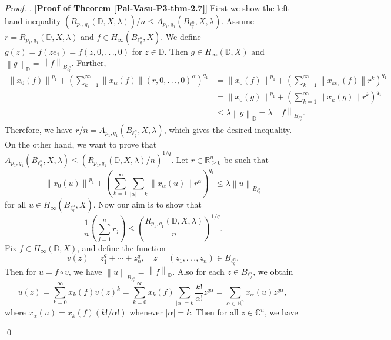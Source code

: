 \documentclass[a4paper,12pt]{amsart}
\theoremstyle{definition}
\newenvironment{pf}[1][]{%
 \vskip 3mm
 \noindent
 \ifthenelse{\equal{#1}{}}%
  {{\slshape Proof. }}%
  {{\slshape #1.} }%
 }%
{\qed\bigskip}
\newcommand{\norm}[1]{\left\lVert#1\right\rVert}
\begin{document}
\begin{pf} [{\bf Proof of Theorem \ref{Pal-Vasu-P3-thm-2.7}}]
	First we show the left-hand inequality $(R_{p_1, q_1}(\mathbb{D}, X, \lambda))/n\leq A_{p_1,q_1}(B_{\ell^n_q},X, \lambda).$ Assume $r=R_{p_1,q_1}(\mathbb{D},X,\lambda)$ and $f\in H_{\infty}(B_{\ell^n_q},X)$. We define $g(z)=f(ze_1)=f(z,0,.\,.\,.,0)$ for $z\in \mathbb{D}.$ Then $g\in H_{\infty}(\mathbb{D},X)$ and $\norm{g}_{\mathbb{D}}=\norm{f}_{B_{\ell^n_q}}$. Further,
	\begin{align*}
		\norm{x_0(f)}^{p_1} + \left(\sum_{k=1}^{\infty}\norm{x_{\alpha}(f)}(r,0,.\,.\,.,0)^{\alpha}\right)^{q_1} &= 	\norm{x_0(f)}^{p_1} + \left(\sum_{k=1}^{\infty}\norm{x_{ke_1}(f)}r^k\right)^{q_1}\\&= \norm{x_0(g)}^{p_1} + \left(\sum_{k=1}^{\infty}\norm{x_k(g)}r^k\right)^{q_1}\\[2mm] & \leq \lambda \norm{g}_{\mathbb{D}}=\lambda \norm{f}_{B_{\ell^n_q}}.
	\end{align*}
	Therefore, we have $r/n=A_{p_1,q_1}(B_{\ell^n_q},X, \lambda)$, which gives the desired inequality. \\[2mm]
	On the other hand, we want to prove that $	A_{p_1,q_1}(B_{\ell^n_q},X, \lambda) \leq \left({R_{p_1,q_1}(\mathbb{D},X,\lambda)}/{n}\right)^{1/q}.$
	Let $r\in \mathbb{R}^n_{\geq 0}$ be such that 
	\begin{equation*}
		\norm{x_0(u)}^{p_1} + \left(\sum_{k=1}^{\infty}\sum_{|\alpha|=k}\norm{x_{\alpha}(u)}r^{\alpha}\right)^{q_1}\leq \lambda \norm{u}_{B_{\ell^n_q}}
	\end{equation*}
	for all $u\in H_{\infty}(B_{\ell^n_q},X)$. Now our aim is to show that 
	\begin{equation*}
		\frac{1}{n}\left(\sum_{j=1}^{n}r_j\right) \leq \left(\frac{R_{p_1,q_1}(\mathbb{D},X,\lambda)}{n}\right)^{1/q}.
	\end{equation*}
	Fix $f\in H_{\infty}(\mathbb{D},X)$, and define the function
	\begin{equation*}
		v(z)=z^q_1+\cdots+z^q_n, \quad z=(z_1,.\,.\,.,z_n)\in B_{\ell^n_q}. 
	\end{equation*}
	Then for $u=f\circ v$, we have $\norm{u}_{B_{\ell^n_q}}=\norm{f}_{\mathbb{D}}$. Also for each $z\in B_{\ell^n_q}$, we obtain
	\begin{equation*}
		u(z)=\sum_{k=0}^{\infty}x_{k}(f)v(z)^k=\sum_{k=0}^{\infty}x_k(f)\sum_{|\alpha|=k}\frac{k!}{\alpha!}z^{q\alpha}=\sum_{\alpha\in \mathbb{N}^n_{0}}x_{\alpha}(u)z^{q\alpha},
	\end{equation*}
	where $x_{\alpha}(u)=x_k(f)(k!/\alpha!)$ whenever $|\alpha|=k$. Then for all $z\in \mathbb{C}^n$, we have

\end{pf}
\end{document}
